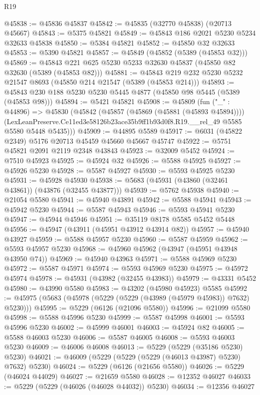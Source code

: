 \begin{lexlean}{R19}
\begin{coremodule}
@45838 := @45836 @45837
@45842 := @45835 (@32770 @45838) (@20713 @45667)
@45843 := @5375 @45821
@45849 := @45843 @186 @2021 @5230 @5234 @32633 @45838
@45850 := @5384 @45821
@45852 := @45850 @32 @32633
@45853 := @5390 @45821
@45857 := @45849 (@45852 (@5389 (@45853 @32)))
@45869 := @45843 @221 @625 @5230 @5233 @32630 @45837 (@45850 @82 @32630 (@5389 (@45853 @82)))
@45881 := @45843 @219 @232 @5230 @5232 @21547 @8693 (@45850 @214 @21547 (@5389 (@45853 @214)))
@45893 := @45843 @230 @188 @5230 @5230 @5445 @4877 (@45850 @98 @5445 (@5389 (@45853 @98)))
@45894 := @5421 @45821
@45908 := @45809
    (fun ("_" : @44896) =>
    @45830
      (@45842
        (@45857 (@45869 (@45881 (@45893 @45894))))
        (LexLeanPreserve.Ce11ed3e58126b23ace35b9ff1b93d0f8.R19.__rel_49 @5585 @5580 @5448 @5435)))
@45909 := @44895 @5589
@45917 := @6031 (@45822 @2349) @5176 @20713 @45459 @45660 @45667 @45747
@45922 := @5751 @45821 @2091 @2119 @2348 @43843
@45923 := @32009 @5452
@45924 := @7510 @45923
@45925 := @45924 @32
@45926 := @5588 @45925
@45927 := @45926 @5230
@45928 := @5587 @45927
@45930 := @5593 @45925 @5230
@45931 := @45928 @45930
@45938 := @5683 (@45931 (@43860 (@32461 @43861)) (@43876 (@32455 @43877)))
@45939 := @5762 @45938
@45940 := @21054 @5580
@45941 := @45940 @43891
@45942 := @5588 @45941
@45943 := @45942 @5230
@45944 := @5587 @45943
@45946 := @5593 @45941 @5230
@45947 := @45944 @45946
@45951 := @35119 @8178 @5585 @5452 @5448
@45956 := @45947 (@43911 (@45951 @43912 @43914 @82))
@45957 := @45940 @43927
@45959 := @5588 @45957 @5230
@45960 := @5587 @45959
@45962 := @5593 @45957 @5230
@45968 := @45960 @45962 (@43947 (@45951 @43948 @43950 @74))
@45969 := @45940 @43963
@45971 := @5588 @45969 @5230
@45972 := @5587 @45971
@45974 := @5593 @45969 @5230
@45975 := @45972 @45974
@45978 := @45931 (@43982 (@32455 @43983))
@45979 := @43331 @5452
@45980 := @43990 @5580
@45983 := @43202 (@45980 @45923) @5585
@45992 := @45975 (@5683 (@45978 (@5229 (@5229 (@43989 (@45979 @45983)) @7632) @5230)))
@45995 := @5229 (@6126 (@21096 @5580))
@45996 := @21099 @5580
@45998 := @5588 @45996 @5230
@45999 := @5587 @45998
@46001 := @5593 @45996 @5230
@46002 := @45999 @46001
@46003 := @45924 @82
@46005 := @5588 @46003 @5230
@46006 := @5587 @46005
@46008 := @5593 @46003 @5230
@46009 := @46006 @46008
@46013 := @5229 (@5229 (@35186 @5230) @5230)
@46021 := @46009 (@5229 (@5229 (@5229 (@46013 @43987) @5230) @7632) @5230)
@46024 := @5229 (@6126 (@21656 @5580))
@46026 := @5229 (@46024 @44029)
@46027 := @21659 @5580
@46028 := @12352 @46027
@46033 := @5229 (@5229 (@46026 (@46028 @44032)) @5230)
@46034 := @12356 @46027

\end{coremodule}
\end{lexlean}
